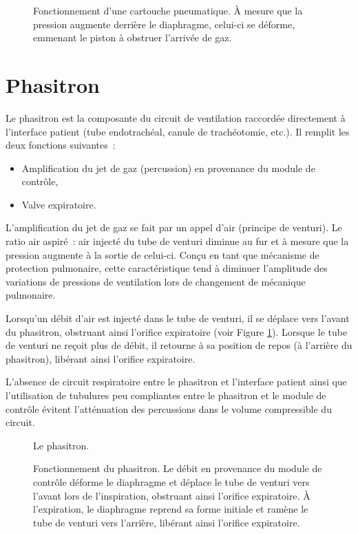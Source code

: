 \begin{figure}[h]
	
	\caption{Fonctionnement d'une cartouche pneumatique. À mesure que la pression
	augmente derrière le diaphragme, celui-ci se déforme, emmenant  le piston à
	obstruer l’arrivée de gaz.} 
\end{figure}

\section{Phasitron}

Le phasitron est la composante du circuit de ventilation raccordée directement à
l’interface patient (tube endotrachéal, canule de trachéotomie, etc.). Il
remplit les deux fonctions suivantes : 

\begin{itemize} 
	\item Amplification du jet de gaz (percussion) en provenance du module de contrôle,
	\item Valve expiratoire.
\end{itemize}

L’amplification du jet de gaz se fait par un appel d’air (principe de venturi).
Le ratio air aspiré : air injecté du tube de venturi diminue au fur et à mesure
que la pression augmente à la sortie de celui-ci. Conçu en tant que mécanisme de
protection pulmonaire, cette caractéristique tend à diminuer l’amplitude des
variations de pressions de ventilation lors de changement de mécanique
pulmonaire.

Lorsqu’un débit d’air est injecté dans le tube de venturi, il se déplace vers
l’avant du phasitron, obstruant ainsi l’orifice expiratoire (voir
Figure \ref{fig:phasitron-coupe}). Lorsque le tube de venturi ne reçoit plus de
débit, il retourne à sa position de repos (à l’arrière du phasitron), libérant
ainsi l’orifice expiratoire.

L’absence de circuit respiratoire entre le phasitron et l’interface patient
ainsi que l’utilisation de tubulures peu compliantes entre le phasitron et le
module de contrôle évitent l’atténuation des percussions dans le volume
compressible du circuit.

\begin{figure}
	
	\caption{Le phasitron.}
\end{figure}

\begin{figure}
	
	\caption{Fonctionnement du phasitron. Le débit en provenance du module de
contrôle déforme le diaphragme et déplace le tube de venturi vers l’avant lors
de l’inspiration, obstruant ainsi l’orifice expiratoire. À l’expiration, le
diaphragme reprend sa forme initiale et ramène le tube de venturi vers
l’arrière, libérant ainsi l’orifice expiratoire.} 
	\label{fig:phasitron-coupe}
\end{figure}

